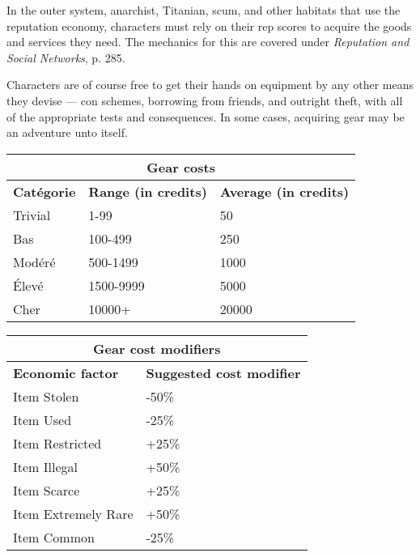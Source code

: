 In the outer system, anarchist, Titanian, scum, and other habitats that use the reputation economy, characters must rely on their rep scores to acquire the goods and services they need. The mechanics for this are covered under \emph{Reputation and Social Networks}, p. 285. 

Characters are of course free to get their hands on equipment by any other means they devise --- con schemes, borrowing from friends, and outright theft, with all of the appropriate tests and consequences. In some cases, acquiring gear may be an adventure unto itself. 

\begin{table} \begin{tabular}{|l|l|l|} \hline

\multicolumn{3}{|c|}{\textbf{Gear costs}}	\\ \hline

\textbf{Catégorie}	&\textbf{Range (in credits)}	&\textbf{Average (in credits)} \\ \hline

Trivial	&1-99	&50 \\ \hline

Bas	&100-499	&250 \\ \hline

Modéré	&500-1499	&1000 \\ \hline

Élevé	&1500-9999	&5000 \\ \hline

Cher	&10000+	&20000 \\ \hline

\end{tabular} \label{tab:gear-costs} \end{table} 

\begin{table} \begin{tabular}{|l|l|} \hline

\multicolumn{2}{|c|}{\textbf{Gear cost modifiers}}	\\ \hline

\textbf{Economic factor}	&\textbf{Suggested cost modifier} \\ \hline

Item Stolen	&-50\% \\ \hline

Item Used	&-25\% \\ \hline

Item Restricted	&+25\% \\ \hline

Item Illegal	&+50\% \\ \hline

Item Scarce	&+25\% \\ \hline

Item Extremely Rare	&+50\% \\ \hline

Item Common	&-25\% \\ \hline

\end{tabular} \label{tab:gear-cost-modifiers} \end{table} 


